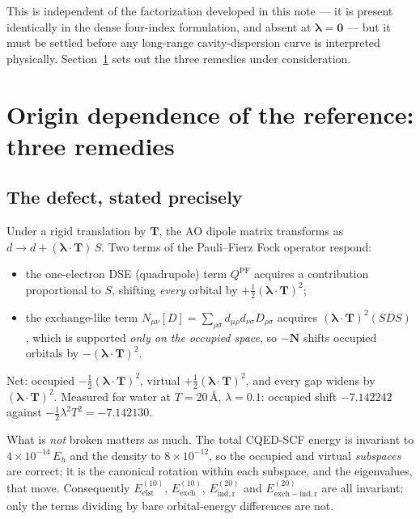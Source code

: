 \documentclass[11pt]{article}
\newcommand{\lam}{\bm{\lambda}}
\begin{document}
This is independent of the factorization developed in this note --- it is
present identically in the dense four-index formulation, and absent at
$\lam = \bm{0}$ --- but it must be settled before any long-range
cavity-dispersion curve is interpreted physically. Section~\ref{sec:origin}
sets out the three remedies under consideration.

\section{Origin dependence of the reference: three remedies}
\label{sec:origin}

\subsection{The defect, stated precisely}

Under a rigid translation by $\bm{T}$, the AO dipole matrix transforms as
$d \to d + (\lam\cdot\bm{T})\,S$. Two terms of the Pauli--Fierz Fock operator
respond:

\begin{itemize}[leftmargin=*, itemsep=3pt]
\item the one-electron DSE (quadrupole) term $Q^{\mathrm{PF}}$ acquires a
contribution proportional to $S$, shifting \emph{every} orbital by
$+\tfrac12(\lam\cdot\bm{T})^2$;
\item the exchange-like term $N_{\mu\nu}[D] = \sum_{\rho\sigma} d_{\mu\rho}
d_{\nu\sigma} D_{\rho\sigma}$ acquires $(\lam\cdot\bm{T})^2 (SDS)$, which is
supported \emph{only on the occupied space}, so $-\bm{N}$ shifts occupied
orbitals by $-(\lam\cdot\bm{T})^2$.
\end{itemize}

Net: occupied $-\tfrac12(\lam\cdot\bm{T})^2$, virtual
$+\tfrac12(\lam\cdot\bm{T})^2$, and every gap widens by $(\lam\cdot\bm{T})^2$.
Measured for water at $T = 20$\,\AA{}, $\lambda = 0.1$: occupied shift
$-7.142242$ against $-\tfrac12\lambda^2T^2 = -7.142130$.

What is \emph{not} broken matters as much. The total CQED-SCF energy is
invariant to $4\times10^{-14}\,E_h$ and the density to $8\times10^{-12}$, so the
occupied and virtual \emph{subspaces} are correct; it is the canonical rotation
within each subspace, and the eigenvalues, that move. Consequently
$E^{(10)}_{\mathrm{elst}}$, $E^{(10)}_{\mathrm{exch}}$,
$E^{(20)}_{\mathrm{ind,r}}$ and $E^{(20)}_{\mathrm{exch-ind,r}}$ are all
invariant; only the terms dividing by bare orbital-energy differences are not.
\end{document}
